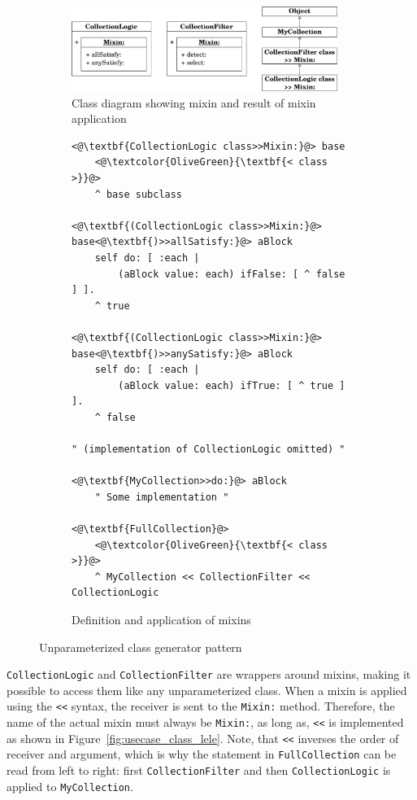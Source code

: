 \begin{figure}[!htp]
\begin{subfigure}[b]{\textwidth}
	\centering
	\includegraphics[width=0.95\textwidth]{usecase_classgen.pdf}
	\caption{Class diagram showing mixin and result of mixin application}
\end{subfigure}

\vspace{10pt}

\begin{subfigure}[b]{\textwidth}
\begin{lstlisting}
<@\textbf{CollectionLogic class>>Mixin:}@> base
    <@\textcolor{OliveGreen}{\textbf{< class >}}@>
    ^ base subclass

<@\textbf{(CollectionLogic class>>Mixin:}@> base<@\textbf{)>>allSatisfy:}@> aBlock
    self do: [ :each | 
        (aBlock value: each) ifFalse: [ ^ false ] ].
    ^ true

<@\textbf{(CollectionLogic class>>Mixin:}@> base<@\textbf{)>>anySatisfy:}@> aBlock
    self do: [ :each | 
        (aBlock value: each) ifTrue: [ ^ true ] ].
    ^ false

" (implementation of CollectionLogic omitted) "

<@\textbf{MyCollection>>do:}@> aBlock
    " Some implementation "

<@\textbf{FullCollection}@>
    <@\textcolor{OliveGreen}{\textbf{< class >}}@>
    ^ MyCollection << CollectionFilter << CollectionLogic
\end{lstlisting}
\caption{Definition and application of mixins}
\end{subfigure}
\caption{Unparameterized class generator pattern}
\label{fig:usecase_unparam_class_gen}
\end{figure}

\texttt{CollectionLogic} and \texttt{CollectionFilter} are wrappers around mixins, making it possible to access them like any unparameterized class. When a mixin is applied using the \texttt{<<} syntax, the receiver is sent to the \texttt{Mixin:} method. Therefore, the name of the actual mixin must always be \texttt{Mixin:}, as long as, \texttt{<<} is implemented as shown in Figure~\ref{fig:usecase_class_lele}. Note, that \texttt{<<} inverses the order of receiver and argument, which is why the statement in \texttt{FullCollection} can be read from left to right: first \texttt{CollectionFilter} and then \texttt{CollectionLogic} is applied to \texttt{MyCollection}.

